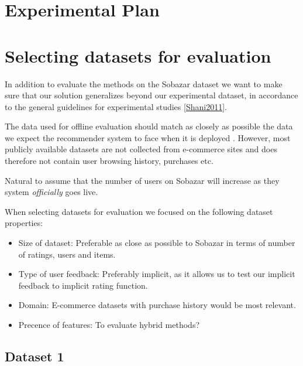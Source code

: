 \section{Experimental Plan}



\section{Selecting datasets for evaluation}

In addition to evaluate the methods on the Sobazar dataset we want to make sure that our solution generalizes beyond our experimental dataset, in accordance to the general guidelines for experimental studies \ref{Shani2011}.

The data used for offline evaluation should match as closely as possible the data we expect the recommender system to face when it is deployed \cite{Gunawardana2009}. However, most publicly available datasets are not collected from e-commerce sites and does therefore not contain user browsing history, purchases etc. 


Natural to assume that the number of users on Sobazar will increase as they system \emph{officially} goes live.





When selecting datasets for evaluation we focused on the following dataset properties:

\begin{itemize}
	\item Size of dataset: Preferable as close as possible to Sobazar in terms of number of ratings, users and items.
	\item Type of user feedback: Preferably implicit, as it allows us to test our implicit feedback to implicit rating function.
	\item Domain: E-commerce datasets with purchase history would be most relevant.
	\item Precence of features: To evaluate hybrid methods?
\end{itemize} 





\subsection{Dataset 1}

